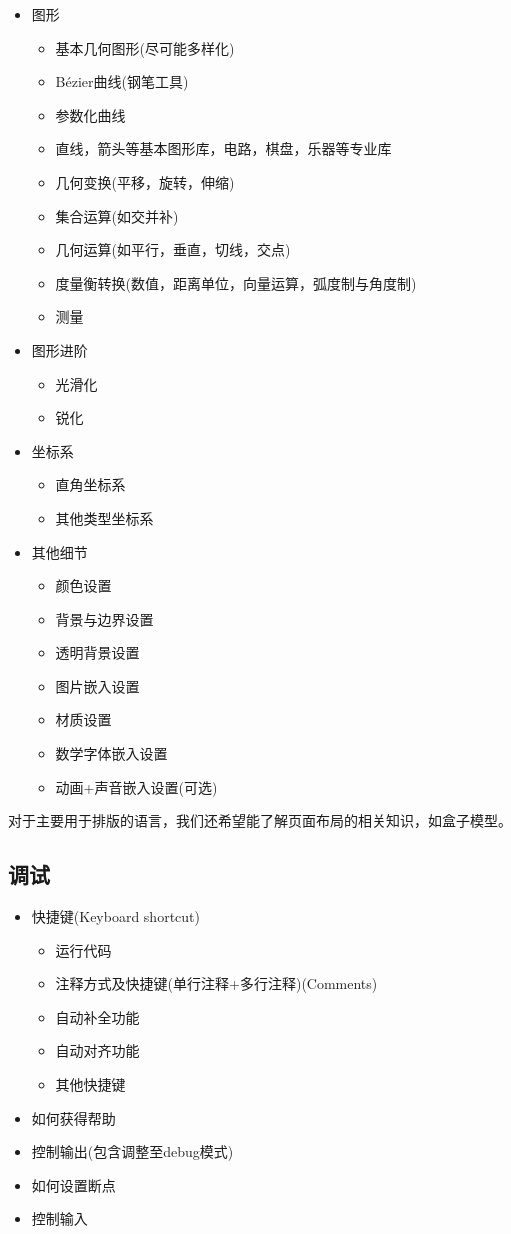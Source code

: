 \documentclass[11pt]{amsart}
\begin{document}
\begin{itemize}
\item 图形
\begin{itemize}
	\item 基本几何图形(尽可能多样化)
	\item Bézier曲线(钢笔工具)
	\item 参数化曲线
	\item 直线，箭头等基本图形库，电路，棋盘，乐器等专业库
	\item 几何变换(平移，旋转，伸缩)
	\item 集合运算(如交并补)
	\item 几何运算(如平行，垂直，切线，交点)
	\item 度量衡转换(数值，距离单位，向量运算，弧度制与角度制)
	\item 测量
\end{itemize}
\item 图形进阶
\begin{itemize}
	\item 光滑化
	\item 锐化
\end{itemize}
\item 坐标系
\begin{itemize}
	\item 直角坐标系
	\item 其他类型坐标系
\end{itemize}
\item 其他细节
\begin{itemize}
	\item 颜色设置
	\item 背景与边界设置
	\item 透明背景设置
	\item 图片嵌入设置
	\item 材质设置
	\item 数学字体嵌入设置
	\item 动画+声音嵌入设置(可选)
\end{itemize}
\end{itemize}
对于主要用于排版的语言，我们还希望能了解页面布局的相关知识，如盒子模型。
\subsection{调试}
\begin{itemize}
	\item 快捷键(Keyboard shortcut)
	\begin{itemize}
		\item 运行代码
		\item 注释方式及快捷键(单行注释+多行注释)(Comments)
		\item 自动补全功能
    	\item 自动对齐功能
		\item 其他快捷键	
	\end{itemize}
	\item 如何获得帮助
	\item 控制输出(包含调整至debug模式)	
	\item 如何设置断点
	\item 控制输入


\end{itemize}
\end{document}

